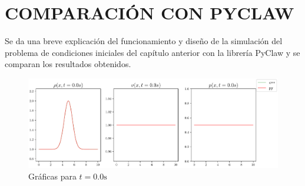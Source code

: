 \chapter{COMPARACIÓN CON PYCLAW}
Se da una breve explicación del funcionamiento y diseño de la simulación del problema de condiciones iniciales del capítulo anterior con la librería PyClaw y se comparan los resultados obtenidos.


%
\begin{figure}[ht]
	\centering
	\includegraphics[width=1.1\linewidth]{../euler1D/plots_en_TDG/py_sin_claw/py_gauss199/1.pdf}
	\caption{Gráficas para $t=0.0\unit{\s}$}
\end{figure}
